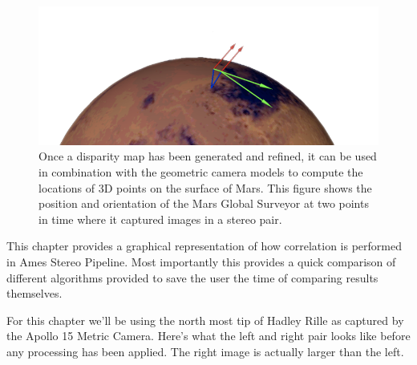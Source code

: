 \begin{figure}[b]
  \centering
  \includegraphics[width=13cm]{images/correlation/triangulation}
  \caption{Once a disparity map has been generated and refined, it can
    be used in combination with the geometric camera models to compute
    the locations of 3D points on the surface of Mars.  This figure
    shows the position and orientation of the Mars Global Surveyor at
    two points in time where it captured images in a stereo pair.}
  \label{fig:asp}
\end{figure}



This chapter provides a graphical representation of how correlation is
performed in Ames Stereo Pipeline. Most importantly this provides a
quick comparison of different algorithms provided to save the user the
time of comparing results themselves.

For this chapter we'll be using the north most tip of Hadley Rille as
captured by the Apollo 15 Metric Camera. Here's what the left and right
pair looks like before any processing has been applied. The right image
is actually larger than the left.


